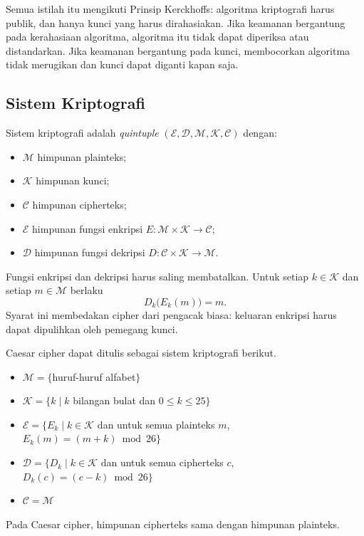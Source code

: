 Semua istilah itu mengikuti Prinsip Kerckhoffs: algoritma kriptografi harus
publik, dan hanya kunci yang harus dirahasiakan. Jika keamanan bergantung pada
kerahasiaan algoritma, algoritma itu tidak dapat diperiksa atau distandarkan.
Jika keamanan bergantung pada kunci, membocorkan algoritma tidak merugikan dan
kunci dapat diganti kapan saja.

\subsection{Sistem Kriptografi}

Sistem kriptografi adalah \textit{quintuple}
$(\mathcal{E},\allowbreak \mathcal{D},\allowbreak \mathcal{M},\allowbreak
\mathcal{K},\allowbreak \mathcal{C})$ dengan:
\begin{itemize}
    \item $\mathcal{M}$ himpunan plainteks;
    \item $\mathcal{K}$ himpunan kunci;
    \item $\mathcal{C}$ himpunan cipherteks;
    \item $\mathcal{E}$ himpunan fungsi enkripsi
          $E: \mathcal{M} \times \mathcal{K} \to \mathcal{C}$;
    \item $\mathcal{D}$ himpunan fungsi dekripsi
          $D: \mathcal{C} \times \mathcal{K} \to \mathcal{M}$.
\end{itemize}

Fungsi enkripsi dan dekripsi harus saling membatalkan. Untuk setiap $k \in
\mathcal{K}$ dan setiap $m \in \mathcal{M}$ berlaku
\[
    D_k\bigl(E_k(m)\bigr) = m .
\]
Syarat ini membedakan cipher dari pengacak biasa: keluaran enkripsi harus dapat
dipulihkan oleh pemegang kunci.

Caesar cipher dapat ditulis sebagai sistem kriptografi berikut.
\begin{itemize}
    \item $\mathcal{M} = \{$huruf-huruf alfabet$\}$
    \item $\mathcal{K} = \{k \mid k$ bilangan bulat dan $0 \le k \le 25\}$
    \item $\mathcal{E} = \{E_k \mid k \in \mathcal{K}$ dan untuk semua plainteks
          $m$, $E_k(m) = (m + k) \bmod 26\}$
    \item $\mathcal{D} = \{D_k \mid k \in \mathcal{K}$ dan untuk semua cipherteks
          $c$, $D_k(c) = (c - k) \bmod 26\}$
    \item $\mathcal{C} = \mathcal{M}$
\end{itemize}
Pada Caesar cipher, himpunan cipherteks sama dengan himpunan plainteks.

